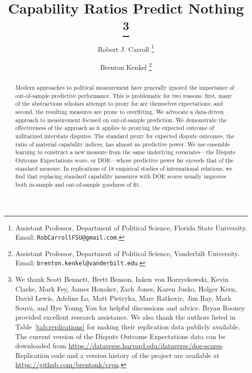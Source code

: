 \documentclass[11pt,oneside]{article}
\title{
  Capability Ratios Predict Nothing%
  \thanks{%
    We thank Scott Bennett, Brett Benson, Inken von Borzyskowski, Kevin Clarke, Mark Fey, James Honaker, Zach Jones, Karen Jusko, Holger Kern, David Lewis, Adeline Lo, Matt Pietryka, Marc Ratkovic, Jim Ray, Mark Souva, and Hye Young You for helpful discussions and advice.
    Bryan Rooney provided excellent research assistance.
    We also thank the authors listed in Table~\ref{tab:replications} for making their replication data publicly available.
    The current version of the Dispute Outcome Expectations data can be downloaded from \url{https://dataverse.harvard.edu/dataverse/doe-scores}.
    Replication code and a version history of the project are available at \url{https://github.com/brentonk/crpn}.
  }%
}
\author{%
  Robert J. Carroll%
  \thanks{%
    Assistant Professor, Department of Political Science, Florida State University.  Email:  \nolinkurl{RobCarrollFSU@gmail.com}.
  }%
  \and%
  Brenton Kenkel%
  \thanks{
    Assistant Professor, Department of Political Science, Vanderbilt University.
    Email: \nolinkurl{brenton.kenkel@vanderbilt.edu}.
  }%
}
\begin{document}
\maketitle

\begin{abstract}
  \noindent Modern approaches to political measurement have generally ignored the importance of out-of-sample predictive performance.
  This is problematic for two reasons: first, many of the abstractions scholars attempt to proxy for are themselves expectations; and second, the resulting measures are prone to overfitting.
  We advocate a data-driven approach to measurement focused on out-of-sample prediction.
  We demonstrate the effectiveness of the approach as it applies to proxying the expected outcome of militarized interstate disputes.
  The standard proxy for expected dispute outcomes, the ratio of material capability indices, has almost no predictive power.
  We use ensemble learning to construct a new measure from the same underlying covariates---the Dispute Outcome Expectations score, or DOE---whose predictive power far exceeds that of the standard measure.
  In replications of 18 empirical studies of international relations, we find that replacing standard capability measures with DOE scores usually improves both in-sample and out-of-sample goodness of fit.
\end{abstract}
\thispagestyle{empty}
\newpage
\setcounter{page}{1}























\clearpage
\appendix


\newpage


\end{document}
